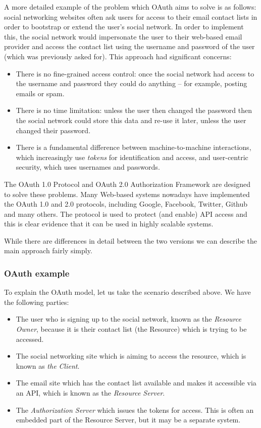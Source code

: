\documentclass{IEEEtran}
\newif\iflong
\begin{document}
A more detailed example of the problem which OAuth aims to solve is as follows: social networking websites often ask users for access to their email contact
lists in order to bootstrap or extend the user's social network. In order to implement this, the social
network would impersonate the user to their web-based email provider and access the contact list using the username and password of the user (which was previously asked for). 
This approach had significant concerns: 
\begin{itemize}
\item There is no fine-grained access control: once the social network had access to the username and password
they could do anything -- for example, posting emails or spam.
\item There is no time limitation: unless the user then changed the password then the social network 
could store this data and re-use it later, unless the user changed their password.
\item There is a fundamental difference between machine-to-machine interactions, which increasingly use \emph{tokens} 
for identification and access, and user-centric security, which uses usernames and passwords. 
\end{itemize}

The OAuth 1.0 Protocol and OAuth 2.0 Authorization Framework are designed to solve these
problems. Many Web-based systems nowadays have implemented the OAuth 1.0 and 2.0 protocols, including Google, 
Facebook, Twitter, Github and many others. The protocol is used to protect (and enable) API 
access and this is clear evidence that it can be used in highly scalable systems. 

\iflong

While there are differences in detail between the two versions we can describe the main approach fairly simply.

\subsubsection{OAuth example}
To explain the OAuth model, let us take the scenario described above. We have the following parties:
\begin{itemize}
\item The user who is signing up to the social network, known as the \emph{Resource Owner}, because it is 
their contact list (the Resource) which is trying to be accessed.
\item The social networking site which is aiming to access the resource, which is known as \emph{the Client}.
\item The email site which has the contact list available and makes it accessible via an API, which is known as the 
\emph{Resource Server}.
\item The \emph{Authorization Server} which issues the tokens for access. This is often an embedded 
part of the Resource Server, but it may be a separate system.
\end{itemize}
\end{document}
